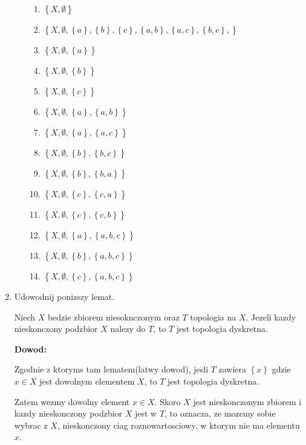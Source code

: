\documentclass{article}
\begin{document}
\begin{enumerate}
\begin{enumerate}[label=(\alph*)]
\begin{enumerate}[label = {$T_{\arabic*} = $}]
\item $\left\{X, \emptyset\right\}$
\item $\left\{X, \emptyset, \left\{a\right\}, \left\{b\right\}, \left\{c\right\}, \left\{a,b\right\},\left\{a,c\right\},\left\{b,c\right\},\right\}$
\item $\left\{X, \emptyset, \left\{a\right\} \right\}$
\item $\left\{X, \emptyset, \left\{b\right\} \right\}$
\item $\left\{X, \emptyset, \left\{c\right\} \right\}$
\item $\left\{X, \emptyset, \left\{a\right\}, \left\{a,b\right\} \right\}$
\item $\left\{X, \emptyset, \left\{a\right\}, \left\{a,c\right\} \right\}$
\item $\left\{X, \emptyset, \left\{b\right\}, \left\{b,c\right\} \right\}$
\item $\left\{X, \emptyset, \left\{b\right\}, \left\{b,a\right\} \right\}$
\item $\left\{X, \emptyset, \left\{c\right\}, \left\{c,a\right\} \right\}$
\item $\left\{X, \emptyset, \left\{c\right\}, \left\{c,b\right\} \right\}$
\item $\left\{X, \emptyset, \left\{a\right\}, \left\{a,b,c\right\} \right\}$
\item $\left\{X, \emptyset, \left\{b\right\}, \left\{a,b,c\right\} \right\}$
\item $\left\{X, \emptyset, \left\{c\right\}, \left\{a,b,c\right\} \right\}$
\end{enumerate}%

\end{enumerate}%
\item Udowodnij ponizszy lemat.
\begin{tcolorbox}[colback=white!90!green,colframe=black!35!green,title=Lemat: Topologia dyskretna i podzbiory nieskonczone]

Niech $X$ bedzie zbiorem niesoknczonym oraz $T$ topologia na $X$. Jezeli kazdy nieskonczony podzbior $X$ nalezy do $T$, to $T$ jest topologia dyskretna.

\end{tcolorbox}
\textbf{Dowod:}

Zgodnie z ktoryms tam lematem(latwy dowod), jesli $T$ zawiera $\left\{x\right\}$ gdzie $x \in X$ jest dowolnym elementem $X$, to $T$ jest topologia dyskretna. 

Zatem wezmy dowolny element $x \in X$. Skoro $X$ jest nieskonczonym zbiorem i kazdy nieskonczony podzbior $X$ jest w $T$, to oznacza, ze mozemy sobie wybrac z $X$, nieskonczony ciag roznowartosciowy, w ktorym nie ma elementu $x$. 


\end{enumerate}
\end{document}
